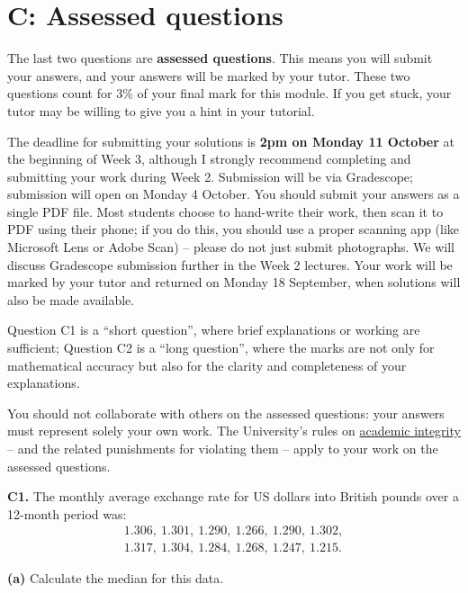 \documentclass[
  a4paper,
]{book}
\theoremstyle{definition}
\theoremstyle{definition}
\theoremstyle{definition}
\theoremstyle{definition}
\theoremstyle{remark}
\begin{document}
\hypertarget{P1-assessed}{%
\section*{C: Assessed questions}\label{P1-assessed}}

The last two questions are \textbf{assessed questions}. This means you will submit your answers, and your answers will be marked by your tutor. These two questions count for 3\% of your final mark for this module. If you get stuck, your tutor may be willing to give you a hint in your tutorial.

The deadline for submitting your solutions is \textbf{2pm on Monday 11 October} at the beginning of Week 3, although I strongly recommend completing and submitting your work during Week 2. Submission will be via Gradescope; submission will open on Monday 4 October.
You should submit your answers as a single PDF file. Most students choose to hand-write their work, then scan it to PDF using their phone; if you do this, you should use a proper scanning app (like Microsoft Lens or Adobe Scan) -- please do not just submit photographs. We will discuss Gradescope submission further in the Week 2 lectures. Your work will be marked by your tutor and returned on Monday 18 September, when solutions will also be made available.

Question C1 is a ``short question'', where brief explanations or working are sufficient; Question C2 is a ``long question'', where the marks are not only for mathematical accuracy but also for the clarity and completeness of your explanations.

You should not collaborate with others on the assessed questions: your answers must represent solely your own work. The University's rules on \href{https://library.leeds.ac.uk/info/1401/academic_skills/46/academic_integrity_and_plagiarism}{academic integrity} -- and the related punishments for violating them -- apply to your work on the assessed questions.

\textbf{C1.} The monthly average exchange rate for US dollars into British pounds over a 12-month period was:
\begin{gather*}
1.306, \ 1.301, \ 1.290, \ 1.266, \ 1.290, \ 1.302,\\
1.317, \ 1.304, \ 1.284, \ 1.268, \ 1.247, \ 1.215.
\end{gather*}

\textbf{(a)} Calculate the median for this data.
\end{document}
